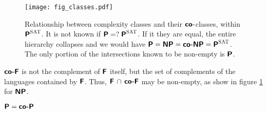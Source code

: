 \documentclass[usletter]{article}
\newcommand {\namedlangset}[1] {\ensuremath{\textnormal{\textsc{#1}}}}
\newcommand {\family}[1]       {\ensuremath{\textnormal{\textsf{\textbf{#1}}}}}
\begin{document}
\begin{figure}[h]
\centering
\graphicspath{{include/fig_classes/}}
\texttt{[image: fig\_classes.pdf]}
\caption{Relationship between complexity classes and their \family{co-}classes,
within $\family{P}^\namedlangset{SAT}$. It is not known if
$\family{P} =?\; \family{P}^\namedlangset{SAT}$. If it they are equal, the
entire hierarchy collapses and we would have
$\family{P} = \family{NP} = \family{co-NP} = \family{P}^\namedlangset{SAT}$. The
only portion of the intersections known to be non-empty is \family{P}.}
\label{classes_fig}
\end{figure}

\begin{remark}
\family{co-F} is not the complement of \family{F} itself, but the set of
complements of the languages contained by \family{F}. Thus,
$\family{F} \,\cap\, \family{co-F}$ may be non-empty, as show in figure
\ref{classes_fig} for \family{NP}.
\end{remark}

\begin{proposition}
$\family{P} = \family{co-P}$
\end{proposition}
\end{document}
